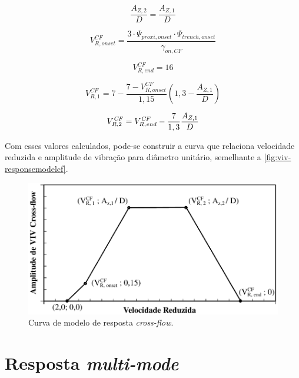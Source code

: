 \begin{equation}
\frac{A_{Z,2}}{D} = \frac{A_{Z,1}}{D}
\end{equation}

\begin{equation}
V_{R,\mathit{onset}}^\mathit{CF} = \frac{3 \cdot \Psi_{\mathit{proxi}, \mathit{onset}} \cdot  \Psi_{\mathit{trench}, \mathit{onset}}}{\gamma_{\mathit{on}, \mathit{CF}}}
\end{equation}

\begin{equation}
V_{R,\mathit{end}}^\mathit{CF} = 16
\end{equation}

\begin{equation}
V_{R, 1}^\mathit{CF} = 7 - \frac{7 - V^\mathit{CF}_{R, \mathit{onset}}}{1,15} \left(1,3 - \frac{A_{Z,1}}{D}\right)
\end{equation}

\begin{equation}
V_{R, 2}^\mathit{CF} = V^\mathit{CF}_{R, \mathit{end}} - \frac{7}{1,3} \frac{A_{Z, 1}}{D}\\
\end{equation}

Com esses valores calculados, pode-se construir a curva que relaciona velocidade reduzida e amplitude de vibração para diâmetro unitário, semelhante a \autoref{fig:viv-responsemodelcf}.

\begin{figure}[!ht]
    \centering
    \caption{Curva de modelo de resposta \textit{cross-flow}.}\label{fig:viv-responsemodelcf}
    \includegraphics[width=0.8\linewidth]{imagens/response_model_CF}
\end{figure}


\section{\label{sec:multimode}Resposta \textit{multi-mode}}

